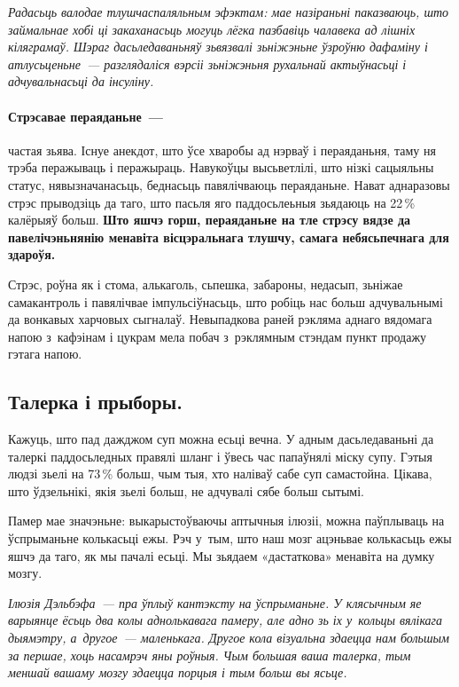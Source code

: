 \emph{Радасьць валодае тлушчаспаляльным эфэктам: мае назіраньні паказваюць, што займальнае хобі ці закаханасьць могуць лёгка пазбавіць чалавека ад лішніх кіляграмаў. Шэраг дасьледаваньняў зьвязвалі зьніжэньне ўзроўню дафаміну і атлусьценьне~--- разглядаліся вэрсіі зьніжэньня рухальнай актыўнасьці і адчувальнасьці да інсуліну.}

\paragraph{Стрэсавае пераяданьне~---} частая зьява. Існуе анекдот, што ўсе хваробы ад нэрваў і пераяданьня, таму ня трэба перажываць і перажыраць. Навукоўцы высьветлілі, што нізкі сацыяльны статус, нявызначанасьць, беднасьць павялічваюць пераяданьне. Нават аднаразовы стрэс прыводзіць да таго, што пасьля яго паддосьлеьныя зьядаюць на 22\,\% калёрыяў больш. \textbf{Што яшчэ горш, пераяданьне на тле стрэсу вядзе да павелічэньнянію менавіта вісцэральнага тлушчу, самага небясьпечнага для здароўя.}

Стрэс, роўна як і стома, алькаголь, сьпешка, забароны, недасып, зьніжае самакантроль і павялічвае імпульсіўнасьць, што робіць нас больш адчувальнымі да вонкавых харчовых сыгналаў. Невыпадкова раней рэкляма аднаго вядомага напою з~кафэінам і цукрам мела побач з~рэклямным стэндам пункт продажу гэтага напою.

\subsection*{Талерка і прыборы.} 
Кажуць, што пад дажджом суп можна есьці вечна. У адным дасьледаваньні да талеркі паддосьледных правялі шланг і ўвесь час папаўнялі міску супу. Гэтыя людзі зьелі на 73\,\% больш, чым тыя, хто наліваў сабе суп самастойна. Цікава, што ўдзельнікі, якія зьелі больш, не адчувалі сябе больш сытымі. 


Памер мае значэньне: выкарыстоўваючы аптычныя ілюзіі, можна паўплываць на ўспрыманьне колькасьці ежы. Рэч у~тым, што наш мозг ацэньвае колькасьць ежы яшчэ да таго, як мы пачалі есьці. Мы зьядаем «дастаткова» менавіта на думку мозгу.

\emph{Ілюзія Дэльбэфа~--- пра ўплыў кантэксту на ўспрыманьне. У клясычным яе варыянце ёсьць два колы аднолькавага памеру, але адно зь іх у~кольцы вялікага дыямэтру, а~другое~--- маленькага. Другое кола візуальна здаецца нам большым за першае, хоць насамрэч яны роўныя. Чым большая ваша талерка, тым меншай вашаму мозгу здаецца порцыя і тым больш вы ясьце.}

